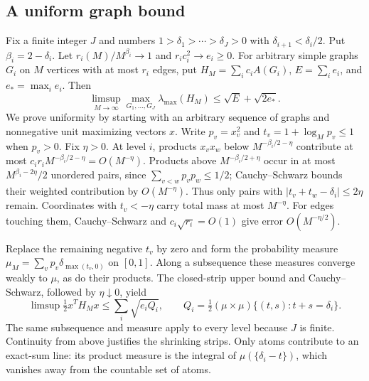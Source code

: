 \subsection{A uniform graph bound}
Fix a finite integer $J$ and numbers
$1>\delta_1>\cdots>\delta_J>0$ with
$\delta_{i+1}<\delta_i/2$. Put $\beta_i=2-\delta_i$.
Let $r_i(M)/M^{\beta_i}\to1$ and $r_i c_i^2\to e_i\geq0$.
For arbitrary simple graphs $G_i$ on $M$ vertices with at most $r_i$
edges, put $H_M=\sum_i c_i A(G_i)$, $E=\sum_i e_i$, and
$e_*=\max_i e_i$. Then
\begin{equation}\label{eq:lacunary-graph-bound}
 \limsup_{M\to\infty}\max_{G_1,\ldots,G_J}\lambda_{\max}(H_M)
 \leq\sqrt E+\sqrt{2e_*}.
\end{equation}
We prove uniformity by starting with an arbitrary sequence of graphs
and nonnegative unit maximizing vectors $x$.
Write $p_v=x_v^2$ and $t_v=1+\log_M p_v\leq1$ when $p_v>0$.
Fix $\eta>0$. At level $i$, products $x_vx_w$ below
$M^{-\beta_i/2-\eta}$ contribute at most
$c_i r_i M^{-\beta_i/2-\eta}=O(M^{-\eta})$.
Products above $M^{-\beta_i/2+\eta}$ occur in at most
$M^{\beta_i-2\eta}/2$ unordered pairs, since
$\sum_{v<w}p_vp_w\leq1/2$; Cauchy--Schwarz bounds their weighted
contribution by $O(M^{-\eta})$.
Thus only pairs with $|t_v+t_w-\delta_i|\leq2\eta$ remain.
Coordinates with $t_v<-\eta$ carry total mass at most $M^{-\eta}$.
For edges touching them, Cauchy--Schwarz and
$c_i\sqrt{r_i}=O(1)$ give error $O(M^{-\eta/2})$.

Replace the remaining negative $t_v$ by zero and form the probability
measure $\mu_M=\sum_v p_v\delta_{\max(t_v,0)}$ on $[0,1]$.
Along a subsequence these measures converge weakly to $\mu$, as do
their products. The closed-strip upper bound and Cauchy--Schwarz,
followed by $\eta\downarrow0$, yield
\begin{equation}\label{eq:measure-bound}
 \limsup\tfrac12x^TH_Mx\leq\sum_i\sqrt{e_iQ_i},
 \qquad Q_i=\tfrac12(\mu\times\mu)\{(t,s):t+s=\delta_i\}.
\end{equation}
The same subsequence and measure apply to every level because $J$
is finite. Continuity from above justifies the shrinking strips.
Only atoms contribute to an exact-sum line: its product measure is
the integral of $\mu(\{\delta_i-t\})$, which vanishes away from the
countable set of atoms.


